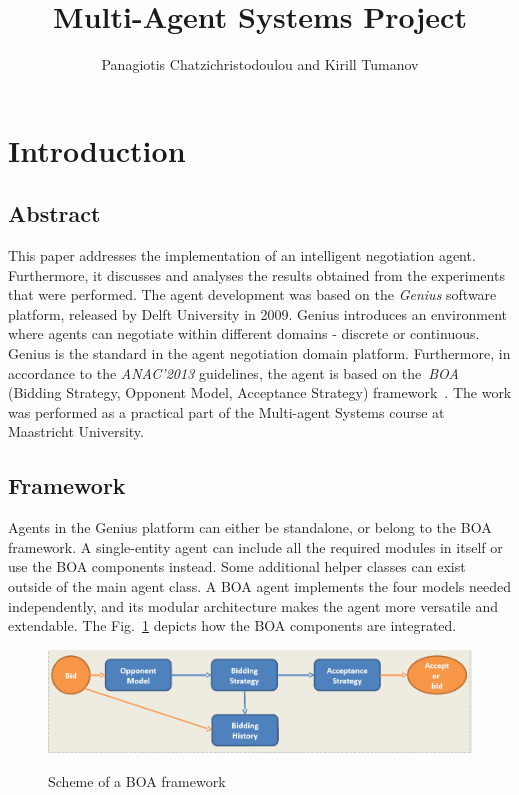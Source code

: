 \documentclass[html]{report}    %
\title{Multi-Agent Systems Project}  %
\author{Panagiotis Chatzichristodoulou and Kirill Tumanov}
\begin{document}

\maketitle                 %
\section{Introduction}
\subsection{Abstract}
This paper addresses the implementation of an intelligent negotiation agent. Furthermore, it discusses and analyses the results obtained from the experiments that were performed. 
The agent development was based on the \textit{Genius} software platform, released by Delft University in 2009. Genius introduces an environment where agents can negotiate within different domains - discrete or continuous. Genius is the standard in the agent negotiation domain platform. Furthermore, in accordance to the \textit{ANAC'2013} guidelines, the agent is based on the~\textit{BOA} (Bidding Strategy, Opponent Model, Acceptance Strategy) framework~\cite{genius}. The work was performed as a practical part of the Multi-agent Systems course at Maastricht University. 

\subsection{Framework}
Agents in the Genius platform can either be standalone, or belong to the BOA framework. A single-entity agent can include all the required modules in itself or use the BOA components instead. Some additional helper classes can exist outside of the main agent class. A BOA agent implements the four models needed independently, and its modular architecture makes the agent more versatile and extendable. The Fig.~\ref{ANAC BOA} depicts how the BOA components are integrated.
\begin{figure}[htbp]
	  \caption{Scheme of a BOA framework}
	  \centering
	    \includegraphics[width=1\textwidth]{fourmodels}
	  \label{ANAC BOA}
\end{figure}
\end{document}

